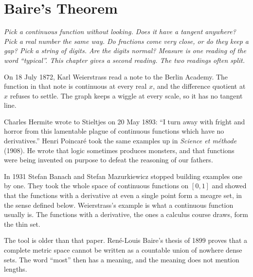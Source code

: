 \chapter{Baire's Theorem}\label{ch:baire}

\begin{center}\itshape
Pick a continuous function without looking. Does it have a tangent anywhere?
Pick a real number the same way. Do fractions come very close, or do they keep a gap?
Pick a string of digits. Are the digits normal?
Measure is one reading of the word ``typical''. This chapter gives a second reading. The two readings often split.
\end{center}

On 18 July 1872, Karl Weierstrass read a note to the Berlin Academy. The function in that note is continuous at every real $x$, and the difference quotient at $x$ refuses to settle. The graph keeps a wiggle at every scale, so it has no tangent line.


Charles Hermite wrote to Stieltjes on 20 May 1893: ``I turn away with fright and horror from this lamentable plague of continuous functions which have no derivatives.'' Henri Poincar\'e took the same examples up in \emph{Science et m\'ethode} (1908). He wrote that logic sometimes produces monsters, and that functions were being invented on purpose to defeat the reasoning of our fathers.

In 1931 Stefan Banach and Stefan Mazurkiewicz stopped building examples one by one. They took the whole space of continuous functions on $[0,1]$ and showed that the functions with a derivative at even a single point form a meagre set, in the sense defined below. Weierstrass's example is what a continuous function usually is. The functions with a derivative, the ones a calculus course draws, form the thin set.

The tool is older than that paper. Ren\'e-Louis Baire's thesis of 1899 proves that a complete metric space cannot be written as a countable union of nowhere dense sets. The word ``most'' then has a meaning, and the meaning does not mention lengths.



